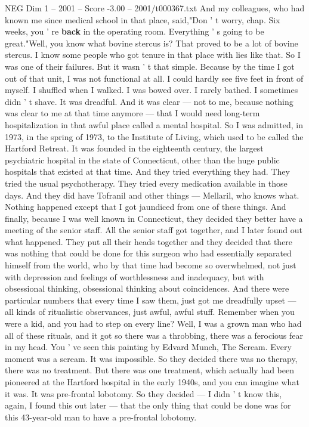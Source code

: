 \begin{textsample}{NEG Dim 1 – 2001 – Score -3.00 – 2001/t000367.txt}
And my colleagues, who had known me since medical school in that place, said,"Don ' t worry, chap.
Six weeks, you ' re \textbf{back} in the operating room.
Everything ' s going to be great."Well, you know what bovine stercus is?
That proved to be a lot of bovine stercus.
I know some people who got tenure in that place with lies like that.
So I was one of their failures.
But it wasn ' t that simple.
Because by the time I got out of that unit, I was not functional at all.
I could hardly see five feet in front of myself.
I shuffled when I walked.
I was bowed over.
I rarely bathed.
I sometimes didn ' t shave.
It was dreadful.
And it was clear — not to me, because nothing was clear to me at that time anymore — that I would need long-term hospitalization in that awful place called a mental hospital.
So I was admitted, in 1973, in the spring of 1973, to the Institute of Living, which used to be called the Hartford Retreat.
It was founded in the eighteenth century, the largest psychiatric hospital in the state of Connecticut, other than the huge public hospitals that existed at that time.
And they tried everything they had.
They tried the usual psychotherapy.
They tried every medication available in those days.
And they did have Tofranil and other things — Mellaril, who knows what.
Nothing happened except that I got jaundiced from one of these things.
And finally, because I was well known in Connecticut, they decided they better have a meeting of the senior staff.
All the senior staff got together, and I later found out what happened.
They put all their heads together and they decided that there was nothing that could be done for this surgeon who had essentially separated himself from the world, who by that time had become so overwhelmed, not just with depression and feelings of worthlessness and inadequacy, but with obsessional thinking, obsessional thinking about coincidences.
And there were particular numbers that every time I saw them, just got me dreadfully upset — all kinds of ritualistic observances, just awful, awful stuff.
Remember when you were a kid, and you had to step on every line?
Well, I was a grown man who had all of these rituals, and it got so there was a throbbing, there was a ferocious fear in my head.
You ' ve seen this painting by Edvard Munch, The Scream.
Every moment was a scream.
It was impossible.
So they decided there was no therapy, there was no treatment.
But there was one treatment, which actually had been pioneered at the Hartford hospital in the early 1940s, and you can imagine what it was.
It was pre-frontal lobotomy.
So they decided — I didn ' t know this, again, I found this out later — that the only thing that could be done was for this 43-year-old man to have a pre-frontal lobotomy.

\end{textsample}
